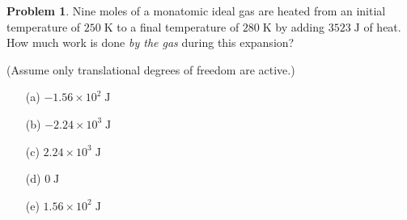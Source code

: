 \documentclass[10pt]{article}
\theoremstyle{definition} %
\newtheorem{problem}{Problem}
\theoremstyle{plain} %
\begin{document}
                              \begin{problem}
                                Nine moles of a monatomic ideal gas are heated from an initial temperature of
                                \(250\;\text{K}\) to a final temperature of \(280\;\text{K}\) by adding
                                \(3523\;\text{J}\) of heat.  How much work is done \emph{by the gas}
                                during this expansion?
                                
                                (Assume only translational degrees of freedom are active.)
                                
                                \begin{enumerate}
                                  \item[(a)] \(-1.56\times10^{2}\;\text{J}\)
                                  \item[(b)] \(-2.24\times10^{3}\;\text{J}\)
                                  \item[(c)] \(2.24\times10^{3}\;\text{J}\)
                                  \item[(d)] \(0\;\text{J}\)
                                  \item[(e)] \(1.56\times10^{2}\;\text{J}\)
                                \end{enumerate}
                                \end{problem}
\end{document}
